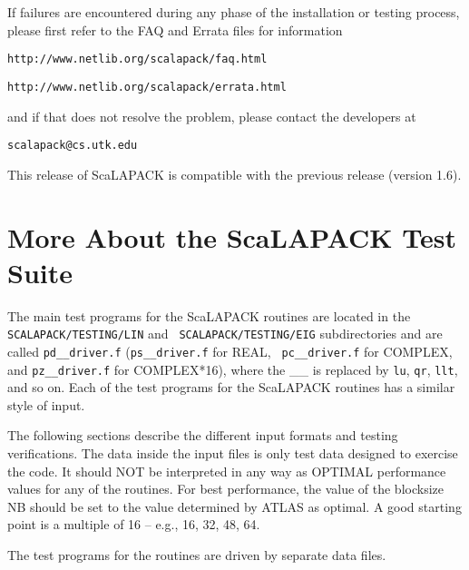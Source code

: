 \documentclass[11pt]{report}
\newcommand{\dent}{\hspace*{\parindent}}
\begin{document}
If failures are encountered during any phase of the installation or
testing process,
please first refer to the FAQ and Errata files for information
\begin{list}{}{}
\item {\tt http://www.netlib.org/scalapack/faq.html}
\item {\tt http://www.netlib.org/scalapack/errata.html}
\end{list}
and if that does not resolve the problem, please contact
the developers at
\begin{list}{}{}
\item {\tt scalapack@cs.utk.edu}
\end{list}

This release of ScaLAPACK is compatible with the previous release
(version 1.6).

\section{More About the ScaLAPACK Test Suite}
\label{LTDET}
\dent
The main test programs for the ScaLAPACK
routines are located in the {\tt SCALAPACK/TESTING/LIN} and {\tt
SCALAPACK/TESTING/EIG} subdirectories and
are called {\tt pd\_\_driver.f} ({\tt ps\_\_driver.f} for REAL, {\tt
pc\_\_driver.f} for COMPLEX, and {\tt pz\_\_driver.f} for COMPLEX*16),
where the \_\_ is replaced by {\tt lu},
{\tt qr}, {\tt llt}, and so on.  Each of the test programs for the
ScaLAPACK routines has a similar style of input.


The following sections describe the different input formats and
testing verifications.  The data inside the input files is only test
data designed to exercise the code.  It should NOT be interpreted
in any way as OPTIMAL performance values for any of the routines.  
For best performance, the value of the blocksize NB should
be set to the value determined by ATLAS as optimal.  A good
starting point is a multiple of 16 -- e.g., 16, 32, 48, 64.

The test programs for the routines are driven by separate data files.
\end{document}
